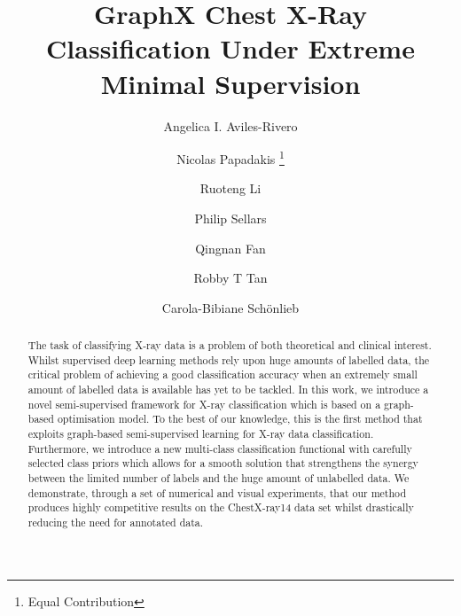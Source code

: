 \documentclass[runningheads]{llncs}
\begin{document}
\title{GraphX Chest X-Ray Classification Under Extreme Minimal Supervision}




\author{
Angelica I. Aviles-Rivero \and
Nicolas Papadakis \thanks{Equal Contribution}   \and
Ruoteng Li  \and
Philip Sellars  \and
Qingnan Fan  \and
Robby T Tan \and
Carola-Bibiane Sch\"onlieb
}









\maketitle

\begin{abstract}
The task of classifying X-ray data is a problem of both theoretical and clinical interest. Whilst supervised deep learning methods rely upon huge amounts of labelled data, the critical problem of achieving a good classification accuracy when an extremely small amount of labelled data is available has yet to be tackled. In this work, we introduce a novel semi-supervised framework for X-ray classification which is based on a graph-based optimisation model. To the best of our knowledge, this is the first method that exploits graph-based semi-supervised learning for X-ray data classification. Furthermore, we introduce a new multi-class classification functional with carefully selected class priors which allows for a smooth solution that strengthens the synergy between the limited number of labels and the huge amount of unlabelled data. We demonstrate, through a set of numerical and visual experiments, that our method produces highly competitive results on the ChestX-ray14 data set whilst drastically reducing the need for annotated data.



\end{abstract}
\end{document}
